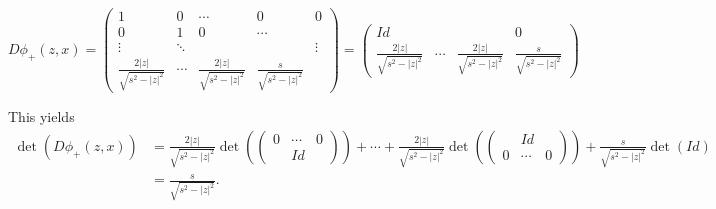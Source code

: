 \documentclass[A4,12pt,twoside]{book}
\begin{document}
{       \[
        D\phi_+ (z,x) = \begin{pmatrix}
            1 &0&\cdots & 0 &0 \\
            0 &1 &0 & \cdots \\
            \vdots & \ddots & && \vdots \\
            \frac{2|z|}{\sqrt{s^2 - |z|^2}} & \cdots & \frac{2|z|}{\sqrt{s^2 - |z|^2}} & \frac{s}{\sqrt{s^2 - |z|^2}}
        \end{pmatrix} = \begin{pmatrix}
            Id & && 0 \\
            \frac{2|z|}{\sqrt{s^2 - |z|^2}} & \cdots & \frac{2|z|}{\sqrt{s^2 - |z|^2}} & \frac{s}{\sqrt{s^2 - |z|^2}}
        \end{pmatrix}
        \]

        This yields
        \begin{align*}
        \det (D\phi_+ (z,x)) &= \frac{2|z|}{\sqrt{s^2 - |z|^2}} \det ( \begin{pmatrix}
            0 & \cdots & 0 \\
            &Id& 
        \end{pmatrix})
         + \cdots +\frac{2|z|}{\sqrt{s^2 - |z|^2}} \det (\begin{pmatrix}
            &Id& \\
            0 & \cdots & 0
        \end{pmatrix} ) + \frac{s}{\sqrt{s^2 - |z|^2}} \det (Id) \\
        &= \frac{s}{\sqrt{s^2 - |z|^2}}.
        \end{align*}
    }
\end{document}
